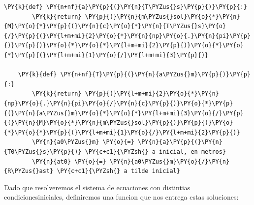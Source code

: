 \begin{tcolorbox}[breakable, size=fbox, boxrule=1pt, pad at break*=1mm,colback=cellbackground, colframe=cellborder]
    \begin{Verbatim}[commandchars=\\\{\}]
    \PY{k}{def} \PY{n+nf}{a}\PY{p}{(}\PY{n}{T\PYZus{}s}\PY{p}{)}\PY{p}{:}
        \PY{k}{return} \PY{p}{(}\PY{n}{m\PYZus{}sol}\PY{o}{*}\PY{n}{M}\PY{o}{*}\PY{p}{(}\PY{n}{c}\PY{o}{*}\PY{n}{T\PYZus{}s}\PY{o}{/}\PY{p}{(}\PY{l+m+mi}{2}\PY{o}{*}\PY{n}{np}\PY{o}{.}\PY{n}{pi}\PY{p}{)}\PY{p}{)}\PY{o}{*}\PY{o}{*}\PY{l+m+mi}{2}\PY{p}{)}\PY{o}{*}\PY{o}{*}\PY{p}{(}\PY{l+m+mi}{1}\PY{o}{/}\PY{l+m+mi}{3}\PY{p}{)}
    
    \PY{k}{def} \PY{n+nf}{T}\PY{p}{(}\PY{n}{a\PYZus{}m}\PY{p}{)}\PY{p}{:}
        \PY{k}{return} \PY{p}{(}\PY{l+m+mi}{2}\PY{o}{*}\PY{n}{np}\PY{o}{.}\PY{n}{pi}\PY{o}{/}\PY{n}{c}\PY{p}{)}\PY{o}{*}\PY{p}{(}\PY{n}{a\PYZus{}m}\PY{o}{*}\PY{o}{*}\PY{l+m+mi}{3}\PY{o}{/}\PY{p}{(}\PY{n}{M}\PY{o}{*}\PY{n}{m\PYZus{}sol}\PY{p}{)}\PY{p}{)}\PY{o}{*}\PY{o}{*}\PY{p}{(}\PY{l+m+mi}{1}\PY{o}{/}\PY{l+m+mi}{2}\PY{p}{)}
        \PY{n}{a0\PYZus{}m} \PY{o}{=} \PY{n}{a}\PY{p}{(}\PY{n}{T0\PYZus{}s}\PY{p}{)} \PY{c+c1}{\PYZsh{} a inicial, en metros}
        \PY{n}{at0} \PY{o}{=} \PY{n}{a0\PYZus{}m}\PY{o}{/}\PY{n}{R\PYZus{}ast} \PY{c+c1}{\PYZsh{} a tilde inicial}
    \end{Verbatim}
    \end{tcolorbox}
Dado que resolveremos el sistema de ecuaciones con distintias condicionesiniciales, definiremos una funcion que nos entrega estas soluciones:
